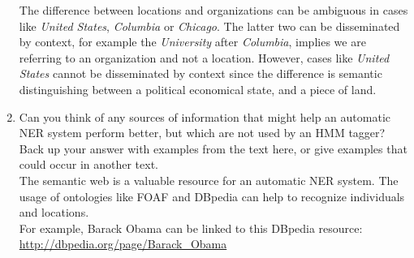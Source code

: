 \documentclass[12pt]{article}
\newenvironment{exercise}[2][Exercise]{\begin{trivlist}
\item[\hskip \labelsep {\bfseries #1}\hskip \labelsep {\bfseries #2.}]}{\end{trivlist}}
\begin{document}
\begin{exercise}{3. HMM Tagger}
\begin{enumerate}[label=(\alph*)]
The difference between locations and organizations can be ambiguous in cases like \textit{United States}, \textit{Columbia} or \textit{Chicago}. The latter two can be disseminated by context, for example the \textit{University} after \textit{Columbia}, implies we are referring to an organization and not a location. However, cases like \textit{United States} cannot be disseminated by context since the difference is semantic distinguishing between a political economical state, and a piece of land.  \\

\item Can you think of any sources of information that might help an automatic NER system perform better, but which are not used by an HMM tagger? Back up your answer with examples from the text here, or give examples that could occur in another text. \\

The semantic web is a valuable resource for an automatic NER system. The usage of ontologies like FOAF and DBpedia can help to recognize individuals and locations.  \\

For example, Barack Obama can be linked to this DBpedia resource: \url{http://dbpedia.org/page/Barack_Obama}

\end{enumerate}
\end{exercise}
 
\end{document}
